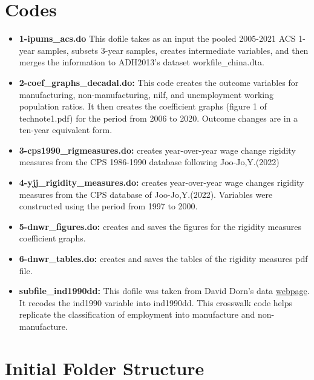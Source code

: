 \documentclass[12pt]{article}
\begin{document}
\section{Codes}

\begin{itemize}

    \item \textbf{1-ipums\_acs.do} This dofile takes as an input the pooled 2005-2021
    ACS 1-year samples, subsets 3-year samples, creates intermediate
    variables, and then merges the information to ADH2013's dataset workfile\_china.dta.

    \item \textbf{2-coef\_graphs\_decadal.do:} This code creates the outcome variables
    for manufacturing, non-manufacturing, nilf, and
    unemployment working population ratios. It then creates the coefficient graphs (figure 1 of technote1.pdf) for
    the period from 2006 to 2020. Outcome changes are in a ten-year equivalent form.

    \item \textbf{3-cps1990\_rigmeasures.do:} creates year-over-year wage change rigidity measures from the CPS 1986-1990 database following Joo-Jo,Y.(2022)

    \item \textbf{4-yjj\_rigidity\_measures.do:} creates year-over-year wage changes rigidity measures from the CPS database of Joo-Jo,Y.(2022). Variables were constructed using the period from 1997 to 2000.

    \item \textbf{5-dnwr\_figures.do:} creates and saves the figures for the rigidity measures coefficient graphs.

    \item \textbf{6-dnwr\_tables.do:} creates and saves the tables of the rigidity measures pdf file.
    
    \item \textbf{subfile\_ind1990dd:} This dofile was taken from David Dorn's data \href{https://www.ddorn.net/data.htm}{webpage}. It recodes the ind1990 variable into ind1990dd.
    This crosswalk code helps replicate the classification of 
    employment into manufacture and non-manufacture. 

\end{itemize}    


\section*{Initial Folder Structure}
\end{document}
